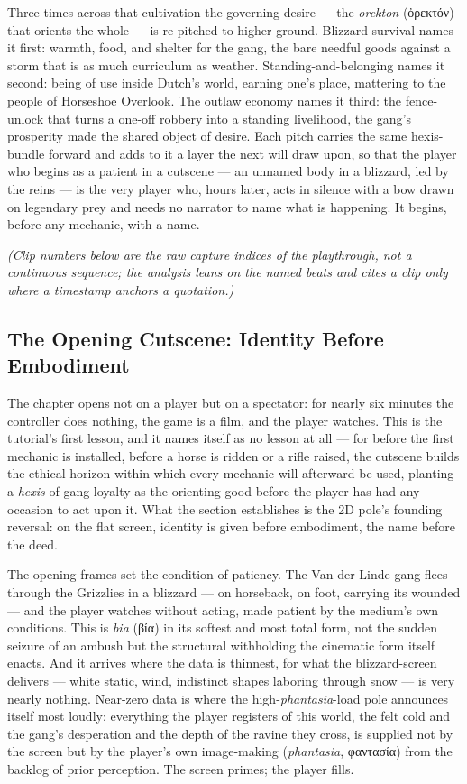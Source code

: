 \documentclass{article}
\newcommand{\gk}[1]{{\greekfont #1}}
\begin{document}
Three times across that cultivation the governing desire — the \textit{orekton} (\gk{ὀρεκτόν}) that orients the whole — is re-pitched to higher ground. Blizzard-survival names it first: warmth, food, and shelter for the gang, the bare needful goods against a storm that is as much curriculum as weather. Standing-and-belonging names it second: being of use inside Dutch's world, earning one's place, mattering to the people of Horseshoe Overlook. The outlaw economy names it third: the fence-unlock that turns a one-off robbery into a standing livelihood, the gang's prosperity made the shared object of desire. Each pitch carries the same hexis-bundle forward and adds to it a layer the next will draw upon, so that the player who begins as a patient in a cutscene — an unnamed body in a blizzard, led by the reins — is the very player who, hours later, acts in silence with a bow drawn on legendary prey and needs no narrator to name what is happening. It begins, before any mechanic, with a name.

\textit{(Clip numbers below are the raw capture indices of the playthrough, not a continuous sequence; the analysis leans on the named beats and cites a clip only where a timestamp anchors a quotation.)}

\bigskip

\subsection*{The Opening Cutscene: Identity Before Embodiment}

The chapter opens not on a player but on a spectator: for nearly six minutes the controller does nothing, the game is a film, and the player watches. This is the tutorial's first lesson, and it names itself as no lesson at all — for before the first mechanic is installed, before a horse is ridden or a rifle raised, the cutscene builds the ethical horizon within which every mechanic will afterward be used, planting a \textit{hexis} of gang-loyalty as the orienting good before the player has had any occasion to act upon it. What the section establishes is the 2D pole's founding reversal: on the flat screen, identity is given before embodiment, the name before the deed.

The opening frames set the condition of patiency. The Van der Linde gang flees through the Grizzlies in a blizzard — on horseback, on foot, carrying its wounded — and the player watches without acting, made patient by the medium's own conditions. This is \textit{bia} (\gk{βία}) in its softest and most total form, not the sudden seizure of an ambush but the structural withholding the cinematic form itself enacts. And it arrives where the data is thinnest, for what the blizzard-screen delivers — white static, wind, indistinct shapes laboring through snow — is very nearly nothing. Near-zero data is where the high-\textit{phantasia}-load pole announces itself most loudly: everything the player registers of this world, the felt cold and the gang's desperation and the depth of the ravine they cross, is supplied not by the screen but by the player's own image-making (\textit{phantasia}, \gk{φαντασία}) from the backlog of prior perception. The screen primes; the player fills.
\end{document}
